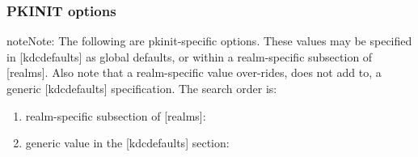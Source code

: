 \documentclass[letterpaper,10pt,english]{sphinxmanual}
\begin{document}
\subsubsection{PKINIT options}
\label{\detokenize{admin/conf_files/kdc_conf:pkinit-options}}
\begin{sphinxadmonition}{note}{Note:}
The following are pkinit-specific options.  These values may
be specified in {[}kdcdefaults{]} as global defaults, or within
a realm-specific subsection of {[}realms{]}.  Also note that a
realm-specific value over-rides, does not add to, a generic
{[}kdcdefaults{]} specification.  The search order is:
\end{sphinxadmonition}
\begin{enumerate}
\item {} 
realm-specific subsection of {[}realms{]}:

%
\begin{sphinxVerbatim}[commandchars=\\\{\}]
\PYG{p}{[}\PYG{p}{]}
      
          
\end{sphinxVerbatim}

\item {} 
generic value in the {[}kdcdefaults{]} section:

%
\begin{sphinxVerbatim}[commandchars=\\\{\}]
\PYG{p}{[}\PYG{p}{]}
      
\end{sphinxVerbatim}

\end{enumerate}
\end{document}
